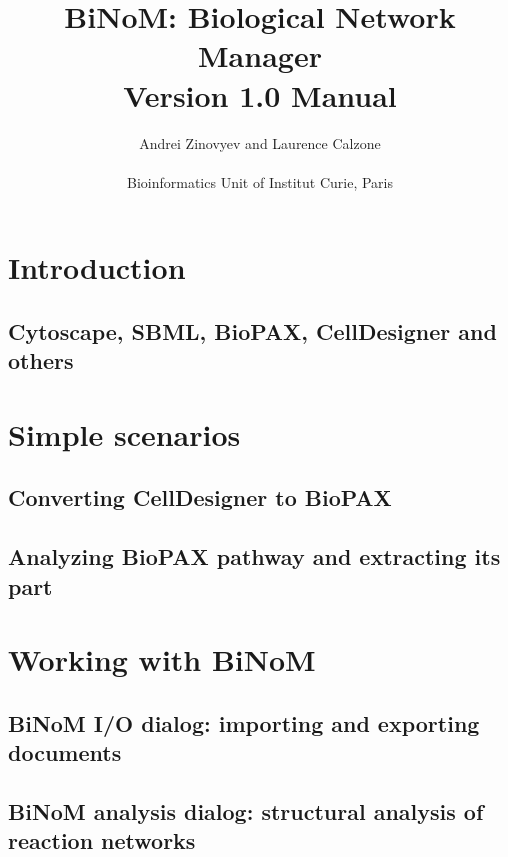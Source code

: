 \documentclass[12pt]{book}
\begin{document}
\title{\huge{BiNoM: Biological Network Manager \\ Version 1.0 Manual}}

\author{Andrei Zinovyev and Laurence Calzone \\ \\ Bioinformatics Unit of Institut Curie, Paris}

\maketitle

\tableofcontents

\chapter{Introduction}

\section{Cytoscape, SBML, BioPAX, CellDesigner and
others}

\chapter{Simple scenarios}

\section{Converting CellDesigner to BioPAX}

\section{Analyzing BioPAX pathway and extracting its part}

\chapter{Working with BiNoM}

\section{BiNoM I/O dialog: importing and exporting documents}

\section{BiNoM analysis dialog: structural analysis of reaction
networks}
\end{document}
